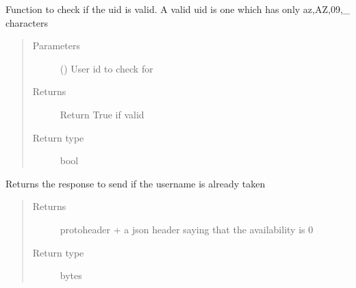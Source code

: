 \documentclass[letterpaper,10pt,english]{sphinxmanual}
\begin{document}
\begin{fulllineitems}

\begin{fulllineitems}
\label{\detokenize{Message:Message.Message.checkValidityOfUID}}
Function to check if the uid is valid. A valid uid is one which has only a\sphinxhyphen{}z,A\sphinxhyphen{}Z,0\sphinxhyphen{}9,\_ characters
\begin{quote}\begin{description}
\item[{Parameters}] \leavevmode
{} () \textendash{} User id to check for

\item[{Returns}] \leavevmode
Return True if valid

\item[{Return type}] \leavevmode
bool

\end{description}\end{quote}

\end{fulllineitems}


\begin{fulllineitems}
\label{\detokenize{Message:Message.Message._signup_uid_not_available}}
Returns the response to send if the username is already taken
\begin{quote}\begin{description}
\item[{Returns}] \leavevmode
protoheader + a json header saying that the availability is 0

\item[{Return type}] \leavevmode
bytes

\end{description}\end{quote}

\end{fulllineitems}



\end{fulllineitems}
\end{document}

